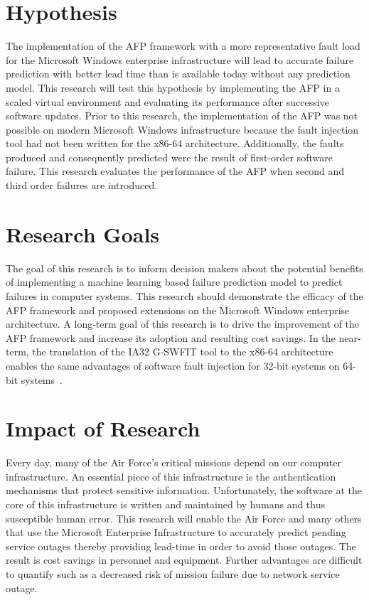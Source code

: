 \section{Hypothesis}
The implementation of the AFP framework with a more representative fault load
for the Microsoft Windows enterprise infrastructure will lead to accurate
failure prediction with better lead time than is available today without any
prediction model.  This research will test this hypothesis by implementing the
AFP in a scaled virtual environment and evaluating its performance after
successive software updates.  Prior to this research, the implementation of the
AFP was not possible on modern Microsoft Windows infrastructure because the
fault injection tool had not been written for the x86-64 architecture.
Additionally, the faults produced and consequently predicted were the result of
first-order software failure.  This research evaluates the performance of the
AFP when second and third order failures are introduced.

\section{Research Goals}
The goal of this research is to inform decision makers about the potential
benefits of implementing a machine learning based failure prediction model to
predict failures in computer systems.  This research should demonstrate the
efficacy of the AFP framework and proposed extensions on the Microsoft Windows
enterprise architecture.  A long-term goal of this research is to drive the
improvement of the AFP framework and increase its adoption and resulting cost
savings.  In the near-term, the translation of the IA32 G-SWFIT tool to the
x86-64 architecture enables the same advantages of software fault injection for
32-bit systems on 64-bit systems~\cite{gswfit}.

\section{Impact of Research}
Every day, many of the Air Force's critical missions depend on our computer
infrastructure.  An essential piece of this infrastructure is the
authentication mechanisms that protect  sensitive information.
Unfortunately, the software at the core of this infrastructure is written and
maintained by humans and thus susceptible human error.  This research will
enable the Air Force and many others that use the Microsoft Enterprise
Infrastructure to accurately predict pending service outages thereby providing
lead-time in order to avoid those outages.  The result is cost savings in
personnel and equipment.  Further advantages are difficult to quantify such as
a decreased risk of mission failure due to network service outage.

